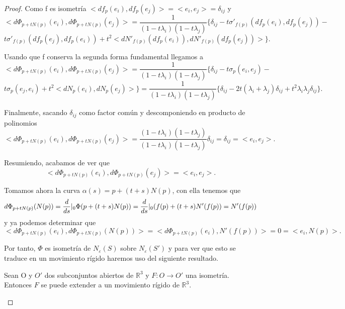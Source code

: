 \begin{proof}
	Como f es isometría $<df_p(e_i), df_p(e_j)> = <e_i, e_j> = \delta_{ij}$ y
	\[
	<d\Phi_{p + tN(p)}(e_i), d\Phi_{p + tN(p)}(e_j)> = \frac{1}{(1 - t\lambda_i)(1 - t\lambda_j)}\{\delta_{ij} - t\sigma'_{f(p)}(df_p(e_i), df_p(e_j)) -  
	\]
	\[
	t\sigma'_{f(p)}(df_p(e_j), df_p(e_i)) + t^2<dN'_{f(p)}(df_p(e_i)), dN'_{f(p)}(df_p(e_j))>\}.
	\]
	
	${ }$\\	
	
	Usando que f conserva la segunda forma fundamental llegamos a
	\[
	<d\Phi_{p + tN(p)}(e_i), d\Phi_{p + tN(p)}(e_j)> = \frac{1}{(1 - t\lambda_i)(1 - t\lambda_j)}\{\delta_{ij} - t\sigma_p(e_i, e_j) - 
	\]
	\[
	t\sigma_p(e_j, e_i) + t^2<dN_p(e_i), dN_p(e_j)>\} = \frac{1}{(1 - t\lambda_i)(1 - t\lambda_j)}\{\delta_{ij} - 2t(\lambda_i + \lambda_j)\delta_{ij} + t^2\lambda_i\lambda_j\delta_{ij}\}.
	\]
	
	Finalmente, sacando $\delta_{ij}$ como factor común y descomponiendo en producto de polinomios
	\[
	<d\Phi_{p + tN(p)}(e_i), d\Phi_{p + tN(p)}(e_j)> = \frac{(1 - t\lambda_i)(1 - t\lambda_j)}{(1 - t\lambda_i)(1 - t\lambda_j)}\delta_{ij} = \delta_{ij} = <e_i, e_j>.
	\]
	
	Resumiendo, acabamos de ver que
	\[
	<d\Phi_{p + tN(p)}(e_i), d\Phi_{p + tN(p)}(e_j)> = <e_i, e_j>.
	\]
	
	Tomamos ahora la curva $\alpha(s) = p + (t + s)N(p)$, con ella tenemos que
	\[
	d\Phi_{p + tN(p)}(N(p)) = \frac{d}{ds}\arrowvert_0\Phi(p + (t + s)N(p)) = \frac{d}{ds}\arrowvert_0(f(p) + (t + s)N'(f(p)) = N'(f(p))
	\]
	y ya podemos determinar que
	\[
	<d\Phi_{p + tN(p)}(e_i), d\Phi_{p + tN(p)}(N(p))> = <d\Phi_{p + tN(p)}(e_i), N'(f(p))> = 0 = <e_i, N(p)>.
	\]
	
	Por tanto, $\Phi$ es isometría de $N_\varepsilon(S)$ sobre $N_\varepsilon(S')$ y para ver que esto se traduce en un movimiento rígido haremos uso del siguiente resultado.
	
	\begin{teorema}
		Sean O y $O'$ dos subconjuntos abiertos de $\mathbb{R}^3$ y $F : O \to O'$ una isometría. Entonces $F$ se puede extender a un movimiento rígido de $\mathbb{R}^3$.
	\end{teorema}
	

\end{proof}
